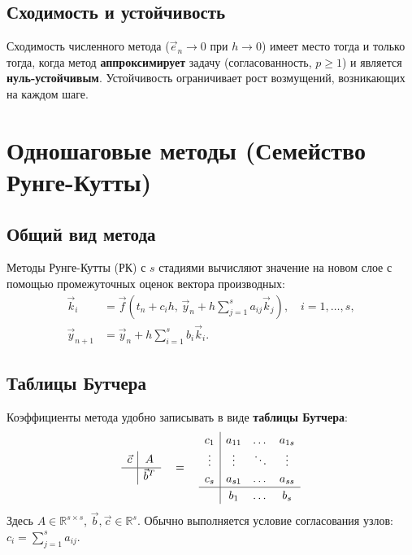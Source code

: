 \documentclass[12pt,a4paper]{article}
\begin{document}
\subsection{Сходимость и устойчивость}
\begin{theorem}
Сходимость численного метода ($\vec{e}_n \to 0$ при $h \to 0$) имеет место тогда и только тогда, когда метод \textbf{аппроксимирует} задачу (согласованность, $p \ge 1$) и является \textbf{нуль-устойчивым}. Устойчивость ограничивает рост возмущений, возникающих на каждом шаге.
\end{theorem}

\section{Одношаговые методы (Семейство Рунге-Кутты)}

\subsection{Общий вид метода}
Методы Рунге-Кутты (РК) с $s$ стадиями вычисляют значение на новом слое с помощью промежуточных оценок вектора производных:
\begin{align}
    \vec{k}_i &= \vec{f}\left( t_n + c_i h, \, \vec{y}_n + h \sum_{j=1}^s a_{ij} \vec{k}_j \right), \quad i = 1, \dots, s, \\
    \vec{y}_{n+1} &= \vec{y}_n + h \sum_{i=1}^s b_i \vec{k}_i.
\end{align}

\subsection{Таблицы Бутчера}
Коэффициенты метода удобно записывать в виде \textbf{таблицы Бутчера}:
\[
\renewcommand{\arraystretch}{1.2}
\begin{array}{c|c}
    \vec{c} & A \\
    \hline
            & \vec{b}^T
\end{array}
\quad = \quad
\begin{array}{c|ccc}
    c_1 & a_{11} & \dots & a_{1s} \\
    \vdots & \vdots & \ddots & \vdots \\
    c_s & a_{s1} & \dots & a_{ss} \\
    \hline
        & b_1 & \dots & b_s
\end{array}
\]
Здесь $A \in \mathbb{R}^{s \times s}$, $\vec{b}, \vec{c} \in \mathbb{R}^s$. Обычно выполняется условие согласования узлов: $c_i = \sum_{j=1}^s a_{ij}$.
\end{document}
